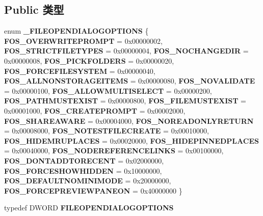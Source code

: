 \subsection*{Public 类型}
\begin{DoxyCompactItemize}
\item 
\mbox{\label{interface_i_file_dialog_addf5aff99f628c16914d38039bb826f4}} 
enum {\bfseries \+\_\+\+F\+I\+L\+E\+O\+P\+E\+N\+D\+I\+A\+L\+O\+G\+O\+P\+T\+I\+O\+NS} \{ \newline
{\bfseries F\+O\+S\+\_\+\+O\+V\+E\+R\+W\+R\+I\+T\+E\+P\+R\+O\+M\+PT} = 0x00000002, 
{\bfseries F\+O\+S\+\_\+\+S\+T\+R\+I\+C\+T\+F\+I\+L\+E\+T\+Y\+P\+ES} = 0x00000004, 
{\bfseries F\+O\+S\+\_\+\+N\+O\+C\+H\+A\+N\+G\+E\+D\+IR} = 0x00000008, 
{\bfseries F\+O\+S\+\_\+\+P\+I\+C\+K\+F\+O\+L\+D\+E\+RS} = 0x00000020, 
\newline
{\bfseries F\+O\+S\+\_\+\+F\+O\+R\+C\+E\+F\+I\+L\+E\+S\+Y\+S\+T\+EM} = 0x00000040, 
{\bfseries F\+O\+S\+\_\+\+A\+L\+L\+N\+O\+N\+S\+T\+O\+R\+A\+G\+E\+I\+T\+E\+MS} = 0x00000080, 
{\bfseries F\+O\+S\+\_\+\+N\+O\+V\+A\+L\+I\+D\+A\+TE} = 0x00000100, 
{\bfseries F\+O\+S\+\_\+\+A\+L\+L\+O\+W\+M\+U\+L\+T\+I\+S\+E\+L\+E\+CT} = 0x00000200, 
\newline
{\bfseries F\+O\+S\+\_\+\+P\+A\+T\+H\+M\+U\+S\+T\+E\+X\+I\+ST} = 0x00000800, 
{\bfseries F\+O\+S\+\_\+\+F\+I\+L\+E\+M\+U\+S\+T\+E\+X\+I\+ST} = 0x00001000, 
{\bfseries F\+O\+S\+\_\+\+C\+R\+E\+A\+T\+E\+P\+R\+O\+M\+PT} = 0x00002000, 
{\bfseries F\+O\+S\+\_\+\+S\+H\+A\+R\+E\+A\+W\+A\+RE} = 0x00004000, 
\newline
{\bfseries F\+O\+S\+\_\+\+N\+O\+R\+E\+A\+D\+O\+N\+L\+Y\+R\+E\+T\+U\+RN} = 0x00008000, 
{\bfseries F\+O\+S\+\_\+\+N\+O\+T\+E\+S\+T\+F\+I\+L\+E\+C\+R\+E\+A\+TE} = 0x00010000, 
{\bfseries F\+O\+S\+\_\+\+H\+I\+D\+E\+M\+R\+U\+P\+L\+A\+C\+ES} = 0x00020000, 
{\bfseries F\+O\+S\+\_\+\+H\+I\+D\+E\+P\+I\+N\+N\+E\+D\+P\+L\+A\+C\+ES} = 0x00040000, 
\newline
{\bfseries F\+O\+S\+\_\+\+N\+O\+D\+E\+R\+E\+F\+E\+R\+E\+N\+C\+E\+L\+I\+N\+KS} = 0x00100000, 
{\bfseries F\+O\+S\+\_\+\+D\+O\+N\+T\+A\+D\+D\+T\+O\+R\+E\+C\+E\+NT} = 0x02000000, 
{\bfseries F\+O\+S\+\_\+\+F\+O\+R\+C\+E\+S\+H\+O\+W\+H\+I\+D\+D\+EN} = 0x10000000, 
{\bfseries F\+O\+S\+\_\+\+D\+E\+F\+A\+U\+L\+T\+N\+O\+M\+I\+N\+I\+M\+O\+DE} = 0x20000000, 
\newline
{\bfseries F\+O\+S\+\_\+\+F\+O\+R\+C\+E\+P\+R\+E\+V\+I\+E\+W\+P\+A\+N\+E\+ON} = 0x40000000
 \}
\item 
\mbox{\label{interface_i_file_dialog_ae976960e9db0c611042ca431013db3f6}} 
typedef D\+W\+O\+RD {\bfseries F\+I\+L\+E\+O\+P\+E\+N\+D\+I\+A\+L\+O\+G\+O\+P\+T\+I\+O\+NS}
\end{DoxyCompactItemize}
